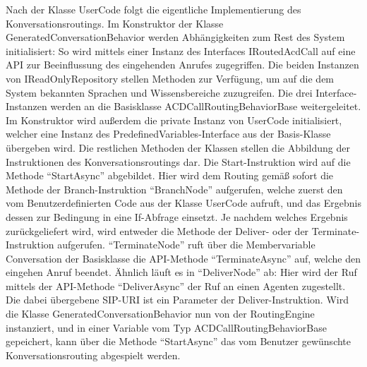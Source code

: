 Nach der Klasse UserCode folgt die eigentliche Implementierung des Konversationsroutings. Im Konstruktor der Klasse GeneratedConversationBehavior werden Abhängigkeiten zum Rest des System initialisiert: So wird mittels einer Instanz des Interfaces IRoutedAcdCall auf eine API zur Beeinflussung des eingehenden Anrufes zugegriffen. Die beiden Instanzen von IReadOnlyRepository stellen Methoden zur Verfügung, um auf die dem System bekannten Sprachen und Wissensbereiche zuzugreifen. Die drei Interface-Instanzen werden an die Basisklasse ACDCallRoutingBehaviorBase weitergeleitet. Im Konstruktor wird außerdem die private Instanz von UserCode initialisiert, welcher eine Instanz des PredefinedVariables-Interface aus der Basis-Klasse übergeben wird. Die restlichen Methoden der Klassen stellen die Abbildung der Instruktionen des Konversationsroutings dar. Die Start-Instruktion wird auf die Methode ``StartAsync'' abgebildet. Hier wird dem Routing gemäß sofort die Methode der Branch-Instruktion ``BranchNode'' aufgerufen, welche zuerst den vom Benutzerdefinierten Code aus der Klasse UserCode aufruft, und das Ergebnis dessen zur Bedingung in eine If-Abfrage einsetzt. Je nachdem welches Ergebnis zurückgeliefert wird, wird entweder die Methode der Deliver- oder der Terminate-Instruktion aufgerufen. ``TerminateNode'' ruft über die Membervariable Conversation der Basisklasse die API-Methode ``TerminateAsync'' auf, welche den eingehen Anruf beendet. Ähnlich läuft es in ``DeliverNode'' ab: Hier wird der Ruf mittels der API-Methode ``DeliverAsync'' der Ruf an einen Agenten zugestellt. Die dabei übergebene SIP-URI ist ein Parameter der Deliver-Instruktion.
\newline
Wird die Klasse GeneratedConversationBehavior nun von der RoutingEngine instanziert, und in einer Variable vom Typ ACDCallRoutingBehaviorBase gepeichert, kann über die Methode ``StartAsync'' das vom Benutzer gewünschte Konversationsrouting abgespielt werden.

